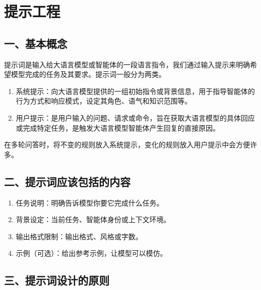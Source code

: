 \setcounter{section}{1}

\hypertarget{ux63d0ux793aux5de5ux7a0b}{%
\section{提示工程}\label{ux63d0ux793aux5de5ux7a0b}}

\hypertarget{ux4e00ux57faux672cux6982ux5ff5}{%
\subsection{一、基本概念}\label{ux4e00ux57faux672cux6982ux5ff5}}

提示词是输入给大语言模型或智能体的一段语言指令，我们通过输入提示来明确希望模型完成的任务及其要求。提示词一般分为两类。

\begin{enumerate}
\def\labelenumi{\arabic{enumi}.}
\item
  系统提示：向大语言模型提供的一组初始指令或背景信息，用于指导智能体的行为方式和响应模式，设定其角色、语气和知识范围等。
\item
  用户提示：是用户输入的问题、请求或命令，旨在获取大语言模型的具体回应或完成特定任务，是触发大语言模型智能体产生回复的直接原因。
\end{enumerate}

在多轮问答时，将不变的规则放入系统提示，变化的规则放入用户提示中会方便许多。

\hypertarget{ux4e8cux63d0ux793aux8bcdux5e94ux8be5ux5305ux62ecux7684ux5185ux5bb9}{%
\subsection{二、提示词应该包括的内容}\label{ux4e8cux63d0ux793aux8bcdux5e94ux8be5ux5305ux62ecux7684ux5185ux5bb9}}

\begin{enumerate}
\def\labelenumi{\arabic{enumi}.}
\item
  任务说明：明确告诉模型你要它完成什么任务。
\item
  背景设定：当前任务、智能体身份或上下文环境。
\item
  输出格式限制：输出格式、风格或字数。
\item
  示例（可选）：给出参考示例，让模型可以模仿。
\end{enumerate}

\hypertarget{ux4e09ux63d0ux793aux8bcdux8bbeux8ba1ux7684ux539fux5219}{%
\subsection{三、提示词设计的原则}\label{ux4e09ux63d0ux793aux8bcdux8bbeux8ba1ux7684ux539fux5219}}

